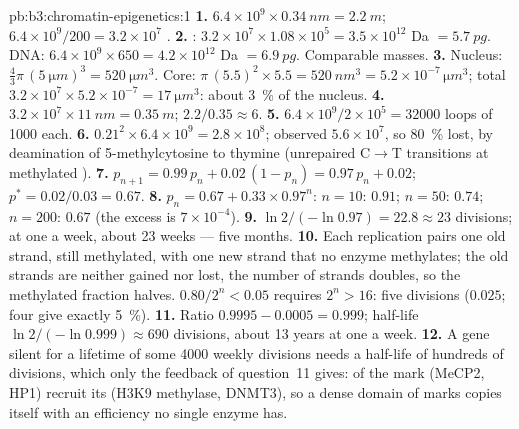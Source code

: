 \begin{solution}{pb:b3:chromatin-epigenetics:1}
\textbf{1.} $6.4\times 10^{9}\times \qty{0.34}{nm} = \qty{2.2}{m}$;
$6.4\times 10^{9}/200 = 3.2\times 10^{7}$ .
\textbf{2.} : $3.2\times 10^{7}\times 1.08\times 10^{5} =
3.5\times 10^{12}$ Da $= \qty{5.7}{pg}$. DNA: $6.4\times 10^{9}\times
650 = 4.2\times 10^{12}$ Da $= \qty{6.9}{pg}$. Comparable masses.
\textbf{3.} Nucleus: $\tfrac{4}{3}\pi\,(\qty{5}{\micro m})^{3} =
\qty{520}{\micro m^3}$. Core: $\pi\,(5.5)^{2}\times 5.5 =
\qty{520}{nm^3} = 5.2\times 10^{-7}\,\unit{\micro m^3}$; total
$3.2\times 10^{7}\times 5.2\times 10^{-7} = \qty{17}{\micro m^3}$:
about \qty{3}{\%} of the nucleus.
\textbf{4.} $3.2\times 10^{7}\times \qty{11}{nm} = \qty{0.35}{m}$;
 $2.2/0.35 \approx 6$.
\textbf{5.} $6.4\times 10^{9}/2\times 10^{5} = \num{32000}$ loops of
\num{1000}  each.
\textbf{6.} $0.21^{2}\times 6.4\times 10^{9} = 2.8\times 10^{8}$;
observed $5.6\times 10^{7}$, so \qty{80}{\%} lost, by deamination of
5-methylcytosine to thymine (unrepaired C$\to$T transitions at
methylated ).
\textbf{7.} $p_{n+1} = 0.99\,p_{n} + 0.02\,(1 - p_{n}) = 0.97\,p_{n} +
0.02$; $p^{*} = 0.02/0.03 = 0.67$.
\textbf{8.} $p_{n} = 0.67 + 0.33\times 0.97^{n}$: $n = 10$: $0.91$;
$n = 50$: $0.74$; $n = 200$: $0.67$ (the excess is $7\times 10^{-4}$).
\textbf{9.} $\ln 2/(-\ln 0.97) = 22.8 \approx 23$ divisions; at one a
week, about \num{23} weeks --- five months.
\textbf{10.} Each replication pairs one old strand, still methylated, with
one new strand that no enzyme methylates; the old strands are neither
gained nor lost, the number of strands doubles, so the methylated
fraction halves. $0.80/2^{n} < 0.05$ requires $2^{n} > 16$: five
divisions ($0.025$; four give exactly \qty{5}{\%}).
\textbf{11.} Ratio $0.9995 - 0.0005 = 0.999$; half-life $\ln
2/(-\ln 0.999) \approx 690$ divisions, about \num{13} years at one a
week.
\textbf{12.} A gene silent for a lifetime of some \num{4000} weekly
divisions needs a half-life of hundreds of divisions, which only the
feedback of question~11 gives:  of the mark (MeCP2, HP1)
recruit its  (H3K9 methylase, DNMT3), so a dense domain of marks
copies itself with an efficiency no single enzyme has.

\end{solution}
